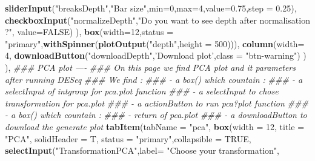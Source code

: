 \documentclass[
  12pt,
]{article}
\newenvironment{Shaded}{\begin{snugshade}}{\end{snugshade}}
\newcommand{\CommentTok}[1]{\textcolor[rgb]{0.56,0.35,0.01}{\textit{#1}}}
\newcommand{\DataTypeTok}[1]{\textcolor[rgb]{0.13,0.29,0.53}{#1}}
\newcommand{\DecValTok}[1]{\textcolor[rgb]{0.00,0.00,0.81}{#1}}
\newcommand{\FloatTok}[1]{\textcolor[rgb]{0.00,0.00,0.81}{#1}}
\newcommand{\KeywordTok}[1]{\textcolor[rgb]{0.13,0.29,0.53}{\textbf{#1}}}
\newcommand{\NormalTok}[1]{#1}
\newcommand{\OtherTok}[1]{\textcolor[rgb]{0.56,0.35,0.01}{#1}}
\newcommand{\StringTok}[1]{\textcolor[rgb]{0.31,0.60,0.02}{#1}}
\begin{document}
\begin{Shaded}
\begin{Highlighting}[]
                        \KeywordTok{sliderInput}\NormalTok{(}\StringTok{"breaksDepth"}\NormalTok{,}\StringTok{"Bar size"}\NormalTok{,}\DataTypeTok{min=}\DecValTok{0}\NormalTok{,}\DataTypeTok{max=}\DecValTok{4}\NormalTok{,}\DataTypeTok{value=}\FloatTok{0.75}\NormalTok{,}\DataTypeTok{step =} \FloatTok{0.25}\NormalTok{),}
                        \KeywordTok{checkboxInput}\NormalTok{(}\StringTok{"normalizeDepth"}\NormalTok{,}\StringTok{"Do you want to see depth after normalisation ?"}\NormalTok{,}
                                      \DataTypeTok{value=}\OtherTok{FALSE}\NormalTok{)}
\NormalTok{                    ),}
                    \KeywordTok{box}\NormalTok{(}\DataTypeTok{width=}\DecValTok{12}\NormalTok{,}\DataTypeTok{status =} \StringTok{"primary"}\NormalTok{,}\KeywordTok{withSpinner}\NormalTok{(}\KeywordTok{plotOutput}\NormalTok{(}\StringTok{"depth"}\NormalTok{,}\DataTypeTok{height =} \DecValTok{500}\NormalTok{))),}
                    \KeywordTok{column}\NormalTok{(}\DataTypeTok{width=} \DecValTok{4}\NormalTok{,}
                           \KeywordTok{downloadButton}\NormalTok{(}\StringTok{"downloadDepth"}\NormalTok{,}\StringTok{'Download plot'}\NormalTok{,}\DataTypeTok{class =} \StringTok{"btn-warning"}\NormalTok{)}
\NormalTok{                    )}
\NormalTok{            ),}
            \CommentTok{### PCA plot ----}
            \CommentTok{### On this page we find PCA plot and it parameters after running DESeq}
            \CommentTok{### We find :}
            \CommentTok{###     - a box() which countain :}
            \CommentTok{###         - a selectInput of intgroup for pca.plot function}
            \CommentTok{###         - a selectInput to chose transformation for pca.plot }
            \CommentTok{###         - a actionButton to run pca?plot function}
            \CommentTok{###     - a box() which countain :}
            \CommentTok{###         - return of pca.plot }
            \CommentTok{###     - a downloadButton to download  the generate plot}
            \KeywordTok{tabItem}\NormalTok{(}\DataTypeTok{tabName =} \StringTok{"pca"}\NormalTok{,}
                    \KeywordTok{box}\NormalTok{(}\DataTypeTok{width =} \DecValTok{12}\NormalTok{,}
                        \DataTypeTok{title =} \StringTok{"PCA"}\NormalTok{, }\DataTypeTok{solidHeader =}\NormalTok{ T, }\DataTypeTok{status =} \StringTok{"primary"}\NormalTok{,}\DataTypeTok{collapsible =} \OtherTok{TRUE}\NormalTok{,}
                        \KeywordTok{selectInput}\NormalTok{(}\StringTok{"TransformationPCA"}\NormalTok{,}\DataTypeTok{label=} \StringTok{"Choose your transformation"}\NormalTok{,}

\end{Highlighting}
\end{Shaded}
\end{document}
